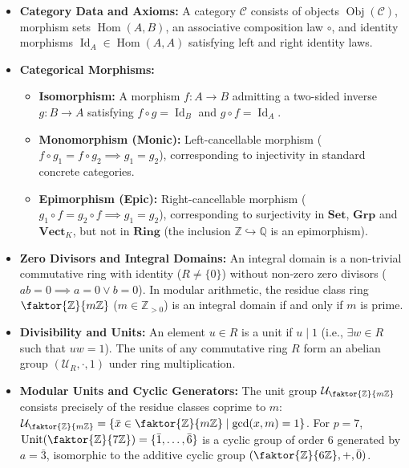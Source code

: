 \begin{overview}
\begin{itemize}
    \item \textbf{Category Data and Axioms:} A category $\mathcal{C}$ consists of objects $\operatorname{Obj}(\mathcal{C})$, morphism sets $\operatorname{Hom}(A, B)$, an associative composition law $\circ$, and identity morphisms $\operatorname{Id}_A \in \operatorname{Hom}(A, A)$ satisfying left and right identity laws.
    \item \textbf{Categorical Morphisms:}
    \begin{itemize}
        \item \textbf{Isomorphism:} A morphism $f \colon A \to B$ admitting a two-sided inverse $g \colon B \to A$ satisfying $f \circ g = \operatorname{Id}_B$ and $g \circ f = \operatorname{Id}_A$.
        \item \textbf{Monomorphism (Monic):} Left-cancellable morphism ($f \circ g_1 = f \circ g_2 \implies g_1 = g_2$), corresponding to injectivity in standard concrete categories.
        \item \textbf{Epimorphism (Epic):} Right-cancellable morphism ($g_1 \circ f = g_2 \circ f \implies g_1 = g_2$), corresponding to surjectivity in $\mathbf{Set}$, $\mathbf{Grp}$ and $\mathbf{Vect}_K$, but not in $\mathbf{Ring}$ (the inclusion $\mathbb{Z} \hookrightarrow \mathbb{Q}$ is an epimorphism).
    \end{itemize}
    \item \textbf{Zero Divisors and Integral Domains:} An integral domain is a non-trivial commutative ring with identity ($R \neq \{0\}$) without non-zero zero divisors ($ab = 0 \implies a = 0 \lor b = 0$). In modular arithmetic, the residue class ring $\faktor{\mathbb{Z}}{m\mathbb{Z}}$ ($m \in \mathbb{Z}_{>0}$) is an integral domain if and only if $m$ is prime.
    \item \textbf{Divisibility and Units:} An element $u \in R$ is a unit if $u \mid 1$ (i.e., $\exists w \in R$ such that $uw = 1$). The units of any commutative ring $R$ form an abelian group $(\mathcal{U}_R, \cdot, 1)$ under ring multiplication.
    \item \textbf{Modular Units and Cyclic Generators:} The unit group $\mathcal{U}_{\faktor{\mathbb{Z}}{m\mathbb{Z}}}$ consists precisely of the residue classes coprime to $m$: $\mathcal{U}_{\faktor{\mathbb{Z}}{m\mathbb{Z}}} = \{\bar{x} \in \faktor{\mathbb{Z}}{m\mathbb{Z}} \mid \operatorname{gcd}(x, m) = 1\}$. For $p = 7$, $\operatorname{Unit}(\faktor{\mathbb{Z}}{7\mathbb{Z}}) = \{\bar{1}, \dots, \bar{6}\}$ is a cyclic group of order $6$ generated by $a = \bar{3}$, isomorphic to the additive cyclic group $(\faktor{\mathbb{Z}}{6\mathbb{Z}}, +, \bar{0})$.
\end{itemize}
\end{overview}
